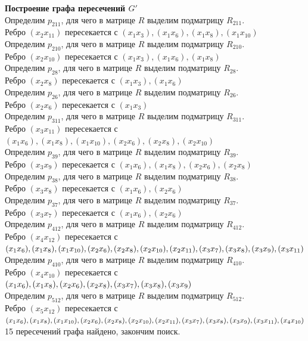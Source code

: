 \documentclass[a4paper,12pt]{article}
\begin{document}
{ \large \centering \textbf{Построение графа пересечений $G'$} \\ }
\noindent
Определим $p_{211}$, для чего в матрице $R$ выделим подматрицу $R_{211}$. \\
Ребро $(x_{2}x_{11})$ пересекается с $(x_{1}x_{3}),(x_{1}x_{6}),(x_{1}x_{8}),(x_{1}x_{10})$ \\
Определим $p_{210}$, для чего в матрице $R$ выделим подматрицу $R_{210}$. \\
Ребро $(x_{2}x_{10})$ пересекается с $(x_{1}x_{3}),(x_{1}x_{6}),(x_{1}x_{8})$ \\
Определим $p_{28}$, для чего в матрице $R$ выделим подматрицу $R_{28}$. \\
Ребро $(x_{2}x_{8})$ пересекается с $(x_{1}x_{3}),(x_{1}x_{6})$ \\
Определим $p_{26}$, для чего в матрице $R$ выделим подматрицу $R_{26}$. \\
Ребро $(x_{2}x_{6})$ пересекается с $(x_{1}x_{3})$ \\
Определим $p_{311}$, для чего в матрице $R$ выделим подматрицу $R_{311}$. \\
Ребро $(x_{3}x_{11})$ пересекается с $(x_{1}x_{6}),(x_{1}x_{8}),(x_{1}x_{10}),(x_{2}x_{6}),(x_{2}x_{8}),(x_{2}x_{10})$ \\
Определим $p_{39}$, для чего в матрице $R$ выделим подматрицу $R_{39}$. \\
Ребро $(x_{3}x_{9})$ пересекается с $(x_{1}x_{6}),(x_{1}x_{8}),(x_{2}x_{6}),(x_{2}x_{8})$\\
Определим $p_{38}$, для чего в матрице $R$ выделим подматрицу $R_{38}$.\\
Ребро $(x_{3}x_{8})$ пересекается с $(x_{1}x_{6}),(x_{2}x_{6})$\\
Определим $p_{37}$, для чего в матрице $R$ выделим подматрицу $R_{37}$.\\
Ребро $(x_{3}x_{7})$ пересекается с $(x_{1}x_{6}),(x_{2}x_{6})$\\
Определим $p_{412}$, для чего в матрице $R$ выделим подматрицу $R_{412}$.\\
Ребро $(x_{4}x_{12})$ пересекается с $(x_{1}x_{6}),(x_{1}x_{8}),(x_{1}x_{10}),(x_{2}x_{6}),(x_{2}x_{8}), \\
(x_{2}x_{10}),(x_{2}x_{11}),(x_{3}x_{7}),(x_{3}x_{8}),(x_{3}x_{9}),(x_{3}x_{11})$\\
Определим $p_{410}$, для чего в матрице $R$ выделим подматрицу $R_{410}$.\\
Ребро $(x_{4}x_{10})$ пересекается с $(x_{1}x_{6}),(x_{1}x_{8}),(x_{2}x_{6}),(x_{2}x_{8}),(x_{3}x_{7}), \\
(x_{3}x_{8}),(x_{3}x_{9})$\\
Определим $p_{512}$, для чего в матрице $R$ выделим подматрицу $R_{512}$.\\
Ребро $(x_{5}x_{12})$ пересекается с $(x_{1}x_{6}),(x_{1}x_{8}),(x_{1}x_{10}),(x_{2}x_{6}),(x_{2}x_{8}),(x_{2}x_{10}),(x_{2}x_{11}), \\
(x_{3}x_{7}),(x_{3}x_{8}),(x_{3}x_{9}),(x_{3}x_{11}),(x_{4}x_{10})$\\
15 пересечений графа найдено, закончим поиск.\\
\end{document}
